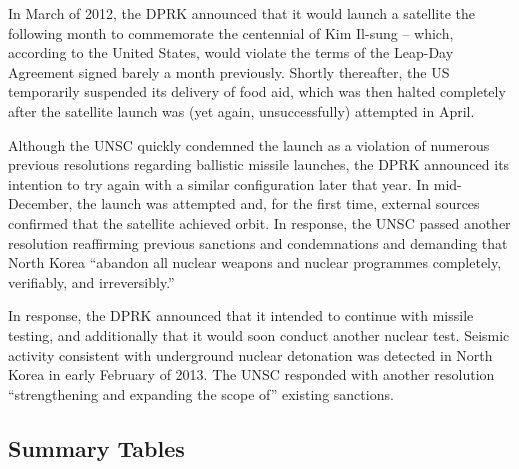 \documentclass{article}
\begin{document}
In March of 2012, the DPRK announced that it would launch a satellite the following month to commemorate the centennial of Kim Il-sung – which, according to the United States, would violate the terms of the Leap-Day Agreement signed barely a month previously\cite{davenport}. Shortly thereafter, the US temporarily suspended its delivery of food aid, which was then halted completely after the satellite launch was (yet again, unsuccessfully) attempted in April\cite{davenport}.

Although the UNSC quickly condemned the launch as a violation of numerous previous resolutions regarding ballistic missile launches\cite{unsc12}, the DPRK announced its intention to try again with a similar configuration later that year. In mid-December, the launch was attempted and, for the first time, external sources confirmed that the satellite achieved orbit\cite{davenport}. In response, the UNSC passed another resolution reaffirming previous sanctions and condemnations and demanding that North Korea “abandon all nuclear weapons and nuclear programmes completely, verifiably, and irreversibly.” \cite{unsc13}

In response, the DPRK announced that it intended to continue with missile testing, and additionally that it would soon conduct another nuclear test\cite{davenport}. Seismic activity consistent with underground nuclear detonation was detected in North Korea in early February of 2013\cite{davenport}. The UNSC responded with another resolution “strengthening and expanding the scope of” existing sanctions\cite{unsc13m}.

\subsection{Summary Tables}
\end{document}
